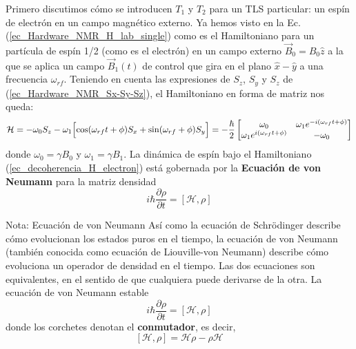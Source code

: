 \documentclass[a4paper,11pt]{book} %
\numberwithin{equation}{chapter}
\def\lc{\left[}
\def\rc{\right]}
\def\Lc{\Bigl[}
\def\Rc{\Bigr]}
\begin{document}
Primero discutimos cómo se introducen $T_1$ y $T_2$ para un TLS particular: un espín de electrón en un campo magnético externo. Ya hemos visto en la Ec. (\ref{ec_Hardware_NMR_H_lab_single}) como es el Hamiltoniano para un partícula de espín 1/2 (como es el electrón) en un campo externo $\vec{B}_0 = B_0 \hat{z}$ a la que se aplica un campo $\vec{B}_1(t)$ de control que gira en el plano $\hat{x}- \hat{y}$ a una frecuencia $\omega_{rf}$. Teniendo en cuenta las expresiones de $S_z$, $S_y$ y $S_z$ de (\ref{ec_Hardware_NMR_Sx-Sy-Sz}), el Hamiltoniano en forma de matriz nos queda:
	\begin{equation} \label{ec_decoherencia_H_electron}
	\mathcal{H} = - \omega_0 S_z - \omega_1 \Lc \cos (\omega_{rf} t+ \phi) S_x + \sin (\omega_{rf} + \phi) S_y \Rc 
	= - \frac{\hbar}{2} \begin{bmatrix}
	\omega_0                               &  \omega_1 e^{-i (\omega_{rf} t + \phi)} \\
	\omega_1 e^{i (\omega_{rf} t + \phi)}  &  -\omega_0 
	\end{bmatrix}
	\end{equation}
donde $\omega_0 = \gamma B_0$ y $\omega_1 = \gamma B_1$. La dinámica de espín bajo el Hamiltoniano (\ref{ec_decoherencia_H_electron}) está gobernada por la \textbf{Ecuación de von Neumann} para la matriz densidad
	\begin{equation}
	i \hbar \frac{\partial \rho}{\partial t} = \lc \mathcal{H}, \rho \rc
	\end{equation}


	\begin{mybox_blue}{Nota: Ecuación de von Neumann}
	Así como la ecuación de Schrödinger describe cómo evolucionan los estados puros en el tiempo, la 
	ecuación de von Neumann (también conocida como ecuación de Liouville-von Neumann) describe cómo 
	evoluciona un operador de densidad en el tiempo. Las dos ecuaciones son equivalentes, en el 
	sentido de que cualquiera puede derivarse de la otra. La ecuación de von Neumann estable
	$$
	i \hbar \frac{\partial \rho}{\partial t} = \lc \mathcal{H}, \rho \rc
	$$
	donde los corchetes denotan el \textbf{conmutador}, es decir,
	$$
	\lc \mathcal{H}, \rho \rc = \mathcal{H} \rho - \rho \mathcal{H}
	$$
	\end{mybox_blue}
\end{document}
